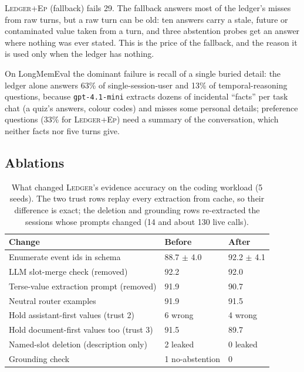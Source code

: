 \documentclass[10pt,conference]{IEEEtran}
\newcommand{\sys}{\textsc{Ledger}}
\newcommand{\hyb}{\textsc{Ledger+Ep}}
\begin{document}
\hyb{} (fallback) fails 29. The fallback answers most of the ledger's misses
from raw turns, but a raw turn can be old: ten answers carry a stale, future
or contaminated value taken from a turn, and three abstention probes get an
answer where nothing was ever stated. This is the price of the fallback, and
the reason it is used only when the ledger has nothing.

On LongMemEval the dominant failure is recall of a single buried detail: the
ledger alone answers 63\% of single-session-user and 13\% of
temporal-reasoning questions, because \texttt{gpt-4.1-mini} extracts dozens of
incidental ``facts'' per task chat (a quiz's answers, colour codes) and misses
some personal details; preference questions (33\% for \hyb{}) need a summary
of the conversation, which neither facts nor five turns give.

\subsection{Ablations}

\begin{table}[t]
\caption{What changed \sys{}'s evidence accuracy on the coding workload
(5 seeds). The two trust rows replay every extraction from cache, so their
difference is exact; the deletion and grounding rows re-extracted the sessions
whose prompts changed (14 and about 130 live calls).}
\label{tab:ablation}
\centering
\footnotesize
\begin{tabular}{@{}lll@{}}
\toprule
Change & Before & After \\
\midrule
Enumerate event ids in schema & 88.7 $\pm$ 4.0 & 92.2 $\pm$ 4.1 \\
LLM slot-merge check (removed) & 92.2 & 92.0 \\
Terse-value extraction prompt (removed) & 91.9 & 90.7 \\
Neutral router examples & 91.9 & 91.5 \\
\midrule
Hold assistant-first values (trust 2) & 6 wrong & 4 wrong \\
Hold document-first values too (trust 3) & 91.5 & 89.7 \\
Named-slot deletion (description only) & 2 leaked & 0 leaked \\
Grounding check & 1 no-abstention & 0 \\
\bottomrule
\end{tabular}
\end{table}

\end{document}
